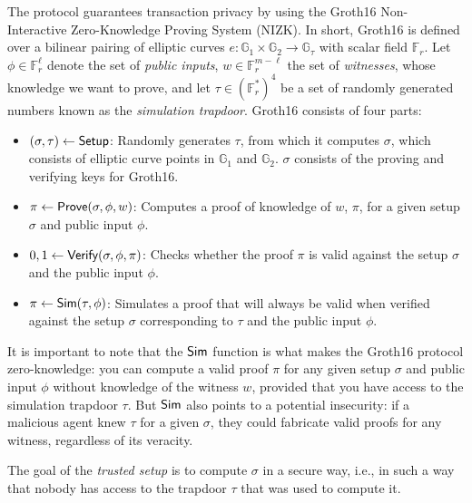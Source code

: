 
The \MantaPay{} protocol \cite{mantapay} guarantees transaction privacy by using the Groth16 \cite{groth16} Non-Interactive Zero-Knowledge Proving System (NIZK). In short, Groth16 is defined over a bilinear pairing of elliptic curves $e: \mathbb{G}_1 \times \mathbb{G}_2 \rightarrow \mathbb{G}_\tau$ with scalar field $\mathbb{F}_r$. Let $\phi \in \mathbb{F}_r^\ell$ denote the set of \emph{public inputs}, $w \in \mathbb{F}_r^{m-\ell}$ the set of \emph{witnesses}, whose knowledge we want to prove, and let $\tau \in (\mathbb{F}_r^{*})^4$ be a set of randomly generated numbers known as the \emph{simulation trapdoor}. Groth16 consists of four parts:
\begin{itemize}
\item $(\sigma, \tau) \leftarrow {\textsf{Setup}}$: Randomly generates $\tau$, from which it computes $\sigma$, which consists of elliptic curve points in $\mathbb{G}_1$ and $\mathbb{G}_2$. $\sigma$ consists of the proving and verifying keys for Groth16.
\item $\pi \leftarrow {\textsf{Prove}}(\sigma, \phi, w)$: Computes a proof of knowledge of $w$, $\pi$, for a given setup $\sigma$ and public input $\phi$.
\item $0, 1 \leftarrow {\textsf{Verify}}(\sigma, \phi, \pi)$: Checks whether the proof $\pi$ is valid against the setup $\sigma$ and the public input $\phi$.
\item $\pi \leftarrow {\textsf{Sim}}(\tau, \phi)$: Simulates a proof that will always be valid when verified against the setup $\sigma$ corresponding to $\tau$ and the public input $\phi$.
\end{itemize}

It is important to note that the ${\textsf{Sim}}$ function is what makes the Groth16 protocol zero-knowledge: you can compute a valid proof $\pi$ for any given setup $\sigma$ and public input $\phi$ without knowledge of the witness $w$, provided that you have access to the simulation trapdoor $\tau$. But ${\textsf{Sim}}$ also points to a potential insecurity: if a malicious agent knew $\tau$ for a given $\sigma$, they could fabricate valid proofs for any witness, regardless of its veracity. 

The goal of the \emph{trusted setup} is to compute $\sigma$ in a secure way, i.e., in such a way that nobody has access to the trapdoor $\tau$ that was used to compute it.
